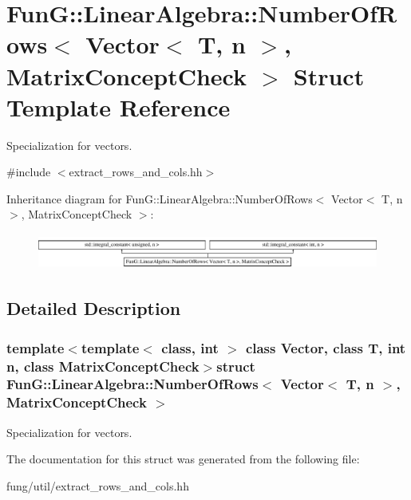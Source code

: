\hypertarget{structFunG_1_1LinearAlgebra_1_1NumberOfRows_3_01Vector_3_01T_00_01n_01_4_00_01MatrixConceptCheck_01_4}{\section{Fun\-G\-:\-:Linear\-Algebra\-:\-:Number\-Of\-Rows$<$ Vector$<$ T, n $>$, Matrix\-Concept\-Check $>$ Struct Template Reference}
\label{structFunG_1_1LinearAlgebra_1_1NumberOfRows_3_01Vector_3_01T_00_01n_01_4_00_01MatrixConceptCheck_01_4}
}


Specialization for vectors.  




{\ttfamily \#include $<$extract\-\_\-rows\-\_\-and\-\_\-cols.\-hh$>$}

Inheritance diagram for Fun\-G\-:\-:Linear\-Algebra\-:\-:Number\-Of\-Rows$<$ Vector$<$ T, n $>$, Matrix\-Concept\-Check $>$\-:\begin{figure}[H]
\begin{center}
\leavevmode
\includegraphics[height=1.196581cm]{structFunG_1_1LinearAlgebra_1_1NumberOfRows_3_01Vector_3_01T_00_01n_01_4_00_01MatrixConceptCheck_01_4}
\end{center}
\end{figure}


\subsection{Detailed Description}
\subsubsection*{template$<$template$<$ class, int $>$ class Vector, class T, int n, class Matrix\-Concept\-Check$>$struct Fun\-G\-::\-Linear\-Algebra\-::\-Number\-Of\-Rows$<$ Vector$<$ T, n $>$, Matrix\-Concept\-Check $>$}

Specialization for vectors. 

The documentation for this struct was generated from the following file\-:\begin{DoxyCompactItemize}
\item 
fung/util/extract\-\_\-rows\-\_\-and\-\_\-cols.\-hh\end{DoxyCompactItemize}
